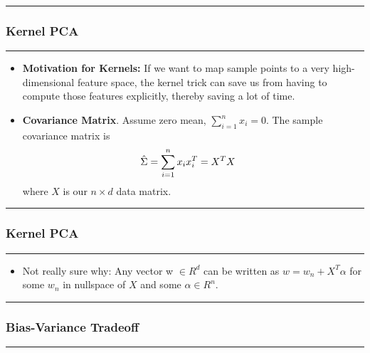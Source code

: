 \documentclass[12pt]{article}
\newcommand{\myspace}{\vspace{2\bigskipamount}}
\begin{document}
\myspace
{}
\hrule 
\subsubsection{Kernel PCA}
\hrule 

\begin{itemize}
	\item \textbf{Motivation for Kernels:} If we want to map sample points to a very high-dimensional feature space, the kernel trick can save us from
	having to compute those features explicitly, thereby saving a lot of time.
	
	\item \textbf{Covariance Matrix}. Assume zero mean, $\sum_{i = 1}^n x_i = 0$. The sample covariance matrix is
	\begin{align}
	\hat \Sigma &= \sum_{i=1}^{n} x_i x_i^T = X^T X
	\end{align}
	where $X$ is our $n \times d$ data matrix. 
\end{itemize}




\myspace
{}
\hrule 
\subsubsection{Kernel PCA}
\hrule 

\begin{itemize}
	\item Not really sure why: Any vector w $\in R^d$ can be written as $w = w_n + X^T \alpha$ for some $w_n$ in nullspace of $X$ and some $\alpha \in R^n$. 
\end{itemize}


\myspace
{}
\hrule 
\subsubsection{Bias-Variance Tradeoff}
\hrule 
\end{document}

